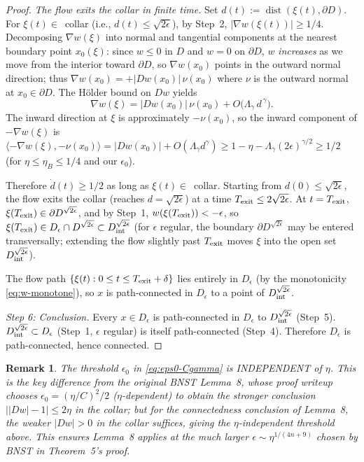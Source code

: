 \documentclass[11pt]{amsart}
\newtheorem{remark}[theorem]{Remark}
\DeclareMathOperator{\dist}{dist}
\begin{document}
\begin{proof}
\emph{The flow exits the collar in finite time.}
Set $d(t):=\dist(\xi(t),\partial D)$.  For $\xi(t)\in$~collar
\textup{(}i.e., $d(t)\le\sqrt{2\epsilon}$\textup{)}, by Step~2,
$|\nabla w(\xi(t))|\ge 1/4$.  Decomposing $\nabla w(\xi)$ into
normal and tangential components at the nearest boundary point
$x_0(\xi)$: since $w\le 0$ in $D$ and $w=0$ on $\partial D$, $w$
\emph{increases} as we move from the interior toward $\partial D$,
so $\nabla w(x_0)$ points in the outward normal direction; thus
$\nabla w(x_0)=+|Dw(x_0)|\,\nu(x_0)$ where $\nu$ is the outward
normal at $x_0\in\partial D$.  The Hölder bound on $Dw$ yields
\[
   \nabla w(\xi)=|Dw(x_0)|\,\nu(x_0)+O\bigl(\Lambda_\gamma\,d^{\,\gamma}\bigr).
\]
The inward direction at $\xi$ is approximately $-\nu(x_0)$, so the
inward component of $-\nabla w(\xi)$ is
$\langle-\nabla w(\xi),-\nu(x_0)\rangle=|Dw(x_0)|+O(\Lambda_\gamma d^\gamma)
\ge 1-\eta-\Lambda_\gamma(2\epsilon)^{\gamma/2}\ge 1/2$
\textup{(}for $\eta\le\eta_B\le 1/4$ and our $\epsilon_0$\textup{)}.

Therefore $\dot d(t)\ge 1/2$ as long as $\xi(t)\in$~collar.  Starting
from $d(0)\le\sqrt{2\epsilon}$, the flow exits the collar (reaches
$d=\sqrt{2\epsilon}$) at a time $T_{\rm exit}\le 2\sqrt{2\epsilon}$.
At $t=T_{\rm exit}$, $\xi(T_{\rm exit})\in\partial D^{\sqrt{2\epsilon}}$,
and by Step~1, $w(\xi(T_{\rm exit}))<-\epsilon$, so
$\xi(T_{\rm exit})\in D_\epsilon\cap D^{\sqrt{2\epsilon}}\subset
D^{\sqrt{2\epsilon}}_{\rm int}$ \textup{(}for $\epsilon$ regular, the
boundary $\partial D^{\sqrt{2\epsilon}}$ may be entered transversally;
extending the flow slightly past $T_{\rm exit}$ moves $\xi$ into the
open set $D^{\sqrt{2\epsilon}}_{\rm int}$\textup{)}.

The flow path $\{\xi(t):0\le t\le T_{\rm exit}+\delta\}$ lies entirely in
$D_\epsilon$ \textup{(}by the monotonicity \eqref{eq:w-monotone}\textup{)},
so $x$ is path-connected in $D_\epsilon$ to a point of
$D^{\sqrt{2\epsilon}}_{\rm int}$.

\emph{Step 6: Conclusion.}
Every $x\in D_\epsilon$ is path-connected in $D_\epsilon$ to
$D^{\sqrt{2\epsilon}}_{\rm int}$ (Step~5).  $D^{\sqrt{2\epsilon}}_{\rm
int}\subset D_\epsilon$ (Step~1, $\epsilon$ regular) is itself
path-connected (Step~4).  Therefore $D_\epsilon$ is path-connected,
hence connected.
\end{proof}

\begin{remark}\label{rem:eps0-indep}
The threshold $\epsilon_0$ in \eqref{eq:eps0-Cgamma} is INDEPENDENT
of $\eta$.  This is the key difference from the original BNST
Lemma~8, whose proof writeup chooses $\epsilon_0=(\eta/C)^2/2$
($\eta$-dependent) to obtain the stronger conclusion $\big||Dw|-
1\big|\le 2\eta$ in the collar; but for the connectedness conclusion
of Lemma~8, the weaker $|Dw|>0$ in the collar suffices, giving the
$\eta$-independent threshold above.  This ensures Lemma~8 applies at
the much larger $\epsilon\sim\eta^{1/(4n+9)}$ chosen by BNST in
Theorem~5's proof.
\end{remark}
\end{document}
